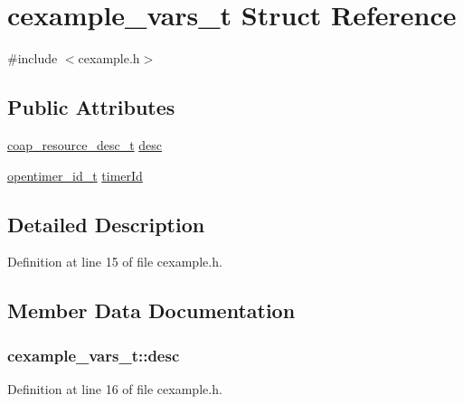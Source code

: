 \hypertarget{structcexample__vars__t}{}\section{cexample\+\_\+vars\+\_\+t Struct Reference}
\label{structcexample__vars__t}


{\ttfamily \#include $<$cexample.\+h$>$}

\subsection*{Public Attributes}
\begin{DoxyCompactItemize}
\item 
\hyperlink{structcoap__resource__desc__t}{coap\+\_\+resource\+\_\+desc\+\_\+t} \hyperlink{structcexample__vars__t_a5670cb9837c6735c2770950c92294ac5}{desc}
\item 
\hyperlink{group___open_timers_gae5ca9e65d270cdfa4bc74008d96d69ab}{opentimer\+\_\+id\+\_\+t} \hyperlink{structcexample__vars__t_a7ad3f1e01ae0cb1eb5ff7379f7aad925}{timer\+Id}
\end{DoxyCompactItemize}


\subsection{Detailed Description}


Definition at line 15 of file cexample.\+h.



\subsection{Member Data Documentation}
\subsubsection[{\texorpdfstring{desc}{desc}}]{ cexample\+\_\+vars\+\_\+t\+::desc}\hypertarget{structcexample__vars__t_a5670cb9837c6735c2770950c92294ac5}{}\label{structcexample__vars__t_a5670cb9837c6735c2770950c92294ac5}


Definition at line 16 of file cexample.\+h.

